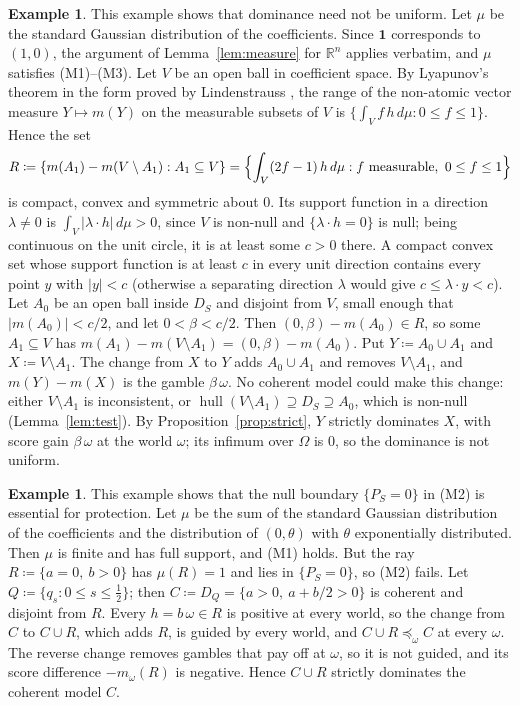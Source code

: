 \documentclass[11pt]{article}
\newcommand{\R}{\mathbb{R}}
\newcommand{\one}{\mathbf{1}}
\newcommand{\hull}{\operatorname{hull}}
\theoremstyle{plain}
\theoremstyle{definition}
\newtheorem{example}[theorem]{Example}
\theoremstyle{remark}
\begin{document}
\begin{example}\label{ex:nonuniform}
This example shows that dominance need not be uniform. Let $\mu$ be the standard Gaussian distribution of the
coefficients. Since $\one$ corresponds to $(1,0)$, the argument of Lemma~\ref{lem:measure} for
$\R^n$ applies verbatim, and $\mu$ satisfies (M1)--(M3). Let $V$ be an open ball in coefficient
space. By Lyapunov's theorem in the form proved by Lindenstrauss \cite{Lyapunov,Lindenstrauss},
the range of the non-atomic vector measure $Y\mapsto m(Y)$ on the measurable subsets of $V$
is $\{\int_Vf\,h\,d\mu:0\le f\le1\}$. Hence the set
\[
  R\coloneqq\{m(A_1)-m(V\setminus A_1):A_1\subseteq V\}=\Bigl\{\int_V(2f-1)\,h\,d\mu:f
  \text{ measurable},\ 0\le f\le1\Bigr\}
\]
is compact, convex and symmetric about $0$. Its support function in a direction $\lambda\ne0$
is $\int_V|\lambda\cdot h|\,d\mu>0$, since $V$ is non-null and $\{\lambda\cdot h=0\}$ is null;
being continuous on the unit circle, it is at least some $c>0$ there. A compact convex set whose
support function is at least $c$ in every unit direction contains every point $y$ with $|y|<c$
(otherwise a separating direction $\lambda$ would give $c\le\lambda\cdot y<c$). Let $A_0$ be an
open ball inside $D_S$ and disjoint from $V$, small enough that $|m(A_0)|<c/2$, and let $0<\beta
<c/2$. Then $(0,\beta)-m(A_0)\in R$, so some $A_1\subseteq V$ has $m(A_1)-m(V\setminus A_1)=
(0,\beta)-m(A_0)$. Put $Y\coloneqq A_0\cup A_1$ and $X\coloneqq V\setminus A_1$. The change from
$X$ to $Y$ adds $A_0\cup A_1$ and removes $V\setminus A_1$, and $m(Y)-m(X)$ is the gamble
$\beta\,\omega$. No coherent model could make this change: either $V\setminus A_1$ is
inconsistent, or $\hull(V\setminus A_1)\supseteq D_S\supseteq A_0$, which is non-null
(Lemma~\ref{lem:test}). By Proposition~\ref{prop:strict}, $Y$ strictly dominates $X$, with score
gain $\beta\,\omega$ at the world $\omega$; its infimum over $\Omega$ is $0$, so the dominance is
not uniform.
\end{example}

\begin{example}\label{ex:PS}
This example shows that the null boundary $\{P_S=0\}$ in (M2) is essential for protection. Let
$\mu$ be the sum of the standard Gaussian distribution of the coefficients and the distribution
of $(0,\theta)$ with $\theta$ exponentially distributed. Then $\mu$ is finite and has full support, and (M1) holds. But the ray $R\coloneqq
\{a=0,\ b>0\}$ has $\mu(R)=1$ and lies in $\{P_S=0\}$, so (M2) fails. Let $Q\coloneqq\{q_s:0\le
s\le\frac12\}$; then $C\coloneqq D_Q=\{a>0,\ a+b/2>0\}$ is coherent and disjoint from $R$. Every
$h=b\,\omega\in R$ is positive at every world, so the change from $C$ to $C\cup R$, which adds
$R$, is guided by every world, and $C\cup R\preceq_\omega C$ at every $\omega$. The reverse
change removes gambles that pay off at $\omega$, so it is not guided, and its score difference
$-m_\omega(R)$ is negative. Hence $C\cup R$ strictly dominates the coherent model $C$.
\end{example}
\end{document}
